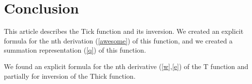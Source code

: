 \section{Conclusion}

This article describes the Tick function and its inversion. We created 
an explicit formula for the nth derivation (\ref{awesome}) of this function,
and we created a summation representation (\ref{q}) of this function.

We found an explicit formula for the nth derivative (\ref{w},\ref{e}) of the
T function and partially for inversion of the Thick function.
